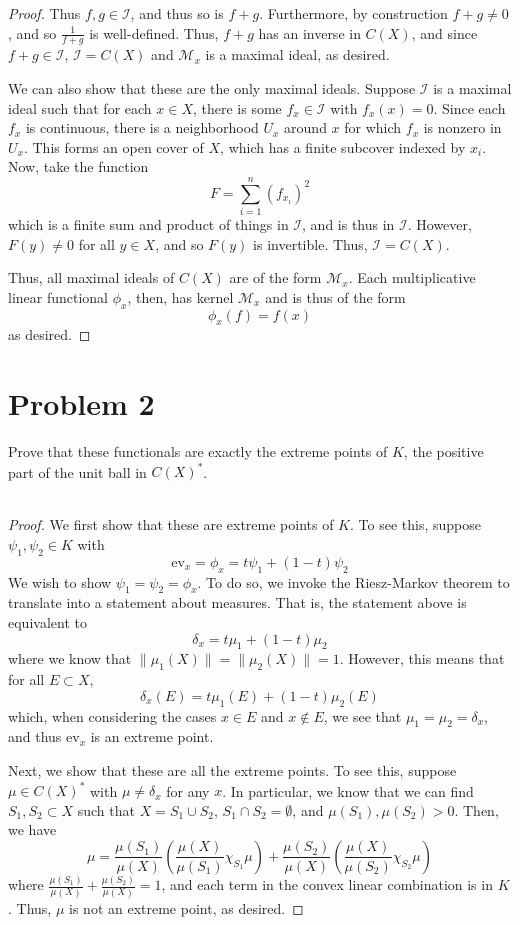\documentclass[fontsize=11pt]{scrartcl} %
\numberwithin{equation}{section} %
\numberwithin{figure}{section} %
\numberwithin{table}{section} %
\newcommand{\ev}{\text{ev}}
\begin{document}
\begin{proof}
    Thus $f,g\in\mathscr{I}$, and thus so is $f+g$. Furthermore, by construction
    $f+g\neq 0$, and so $\frac{1}{f+g}$ is well-defined. Thus, $f+g$ has an
    inverse in $C(X)$, and since $f+g\in\mathscr{I}$, $\mathscr{I}=C(X)$ and
    $\mathscr{M}_x$ is a maximal ideal, as desired.

    We can also show that these are the only maximal ideals. Suppose
    $\mathscr{I}$ is a maximal ideal such that for each $x\in X$, there is some
    $f_x\in \mathscr{I}$ with $f_x(x)=0$. Since each $f_x$ is continuous, there
    is a neighborhood $U_x$ around $x$ for which $f_x$ is nonzero in $U_x$. This
    forms an open cover of $X$, which has a finite subcover indexed by $x_i$.
    Now, take the function
    \[
        F = \sum_{i=1}^n (f_{x_i})^2
    \]
    which is a finite sum and product of things in $\mathscr{I}$, and is thus in
    $\mathscr{I}$. However, $F(y)\neq 0$ for all $y\in X$, and so $F(y)$ is
    invertible. Thus, $\mathscr{I} = C(X)$.

    Thus, all maximal ideals of $C(X)$ are of the form $\mathscr{M}_x$. Each
    multiplicative linear functional $\phi_x$, then, has kernel $\mathscr{M}_x$
    and is thus of the form
    \[
    \phi_x(f) = f(x)
    \]
    as desired.
\end{proof}

\newpage

\section*{Problem 2}
Prove that these functionals are exactly the extreme points of $K$, the positive
part of the unit ball in $C(X)^*$.
\\
\\
\begin{proof}
    We first show that these are extreme points of $K$. To see this, suppose
    $\psi_1,\psi_2\in K$ with
    \[
        \ev_x = \phi_x = t\psi_1 + (1-t)\psi_2
    \]
    We wish to show $\psi_1 = \psi_2 = \phi_x$.
    To do so, we invoke the Riesz-Markov theorem to translate into a statement
    about measures. That is, the statement above is equivalent to
    \[
        \delta_x = t\mu_1 + (1-t)\mu_2
    \]
    where we know that $\|\mu_1(X)\|=\|\mu_2(X)\|=1$. However, this means that
    for all $E\subset X$,
    \[
        \delta_x(E) = t\mu_1(E) + (1-t)\mu_2(E)
    \]
    which, when considering the cases $x\in E$ and $x\not\in E$, we see that
    $\mu_1=\mu_2=\delta_x$, and thus $\ev_x$ is an extreme point.

    Next, we show that these are all the extreme points. To see this, suppose
    $\mu\in C(X)^*$ with $\mu\neq \delta_x$ for any $x$. In particular, we know
    that we can find $S_1,S_2\subset X$ such that $X=S_1\cup S_2$, $S_1\cap
    S_2=\emptyset$, and $\mu(S_1),\mu(S_2)>0$. Then, we have
    \[
        \mu = \frac{\mu(S_1)}{\mu(X)}(\frac{\mu(X)}{\mu(S_1)}\chi_{S_1}\mu) +
        \frac{\mu(S_2)}{\mu(X)}(\frac{\mu(X)}{\mu(S_2)}\chi_{S_2}\mu)
    \]
    where $\frac{\mu(S_1)}{\mu(X)} + \frac{\mu(S_2)}{\mu(X)} = 1$, and each
    term in the convex linear combination is in $K$. Thus, $\mu$ is not an
    extreme point, as desired.
\end{proof}
\end{document}
